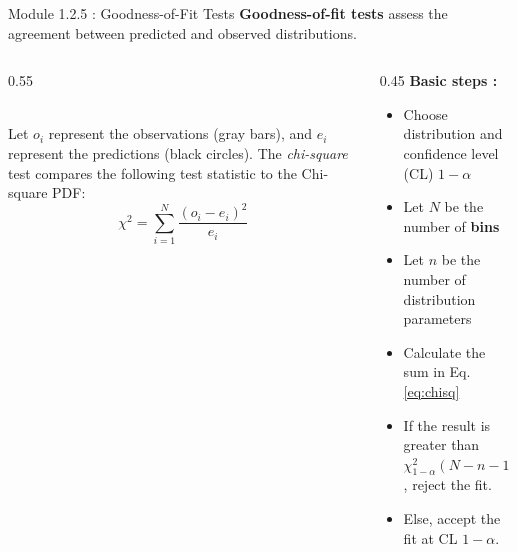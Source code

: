 \documentclass{beamer}
\begin{document}
\begin{frame}{Module 1.2.5 : Goodness-of-Fit Tests}
\scriptsize
\textbf{Goodness-of-fit tests} assess the agreement between predicted and observed distributions. \\ \vspace{0.25cm}
\begin{columns}[T]
\begin{column}{0.55\textwidth}
 \\ \vspace{0.15cm}
Let $o_i$ represent the observations (gray bars), and $e_i$ represent the predictions (black circles).  The \textit{chi-square} test compares the following test statistic to the Chi-square PDF:
\begin{equation}
\chi^2 = \sum_{i=1}^N \frac{(o_i - e_i)^2}{e_i} \label{eq:chisq}
\end{equation}
\end{column}
\begin{column}{0.45\textwidth}
\textbf{Basic steps :}
\begin{itemize}
\item Choose distribution and confidence level (CL) $1-\alpha$
\item Let $N$ be the number of \textbf{bins}
\item Let $n$ be the number of distribution parameters
\item Calculate the sum in Eq. \ref{eq:chisq}
\item If the result is greater than $\chi^2_{1-\alpha}(N-n-1)$, reject the fit.
\item Else, accept the fit at CL $1-\alpha$.
\end{itemize}
\end{column}
\end{columns}
\end{frame}
\end{document}
